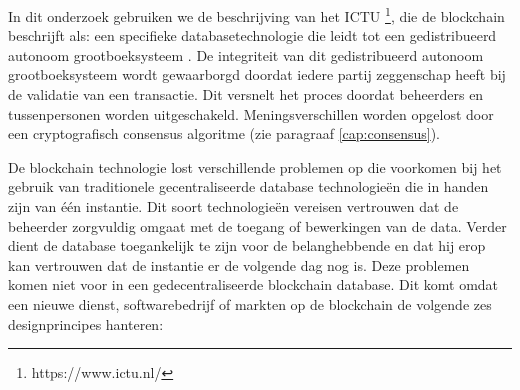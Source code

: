 In dit onderzoek gebruiken we de beschrijving van het ICTU \footnote{https://www.ictu.nl/}, die de blockchain beschrijft als: een specifieke databasetechnologie die leidt tot een gedistribueerd autonoom grootboeksysteem \cite{kaptijn}. De integriteit van dit gedistribueerd autonoom grootboeksysteem wordt gewaarborgd doordat iedere partij zeggenschap heeft bij de validatie van een transactie. Dit versnelt het proces doordat beheerders en tussenpersonen worden uitgeschakeld. Meningsverschillen worden opgelost door een cryptografisch consensus algoritme (zie paragraaf \ref{cap:consensus}).\par

De blockchain technologie lost verschillende problemen op die voorkomen bij het gebruik van traditionele gecentraliseerde database technologieën die in handen zijn van één instantie. Dit soort technologieën vereisen vertrouwen dat de beheerder zorgvuldig omgaat met de toegang of bewerkingen van de data. Verder dient de database toegankelijk te zijn voor de belanghebbende en dat hij erop kan vertrouwen dat de instantie er de volgende dag nog is. Deze problemen komen niet voor in een gedecentraliseerde blockchain database. Dit komt omdat een nieuwe dienst, softwarebedrijf of markten op de blockchain de volgende zes designprincipes \cite{blockRev} hanteren:
